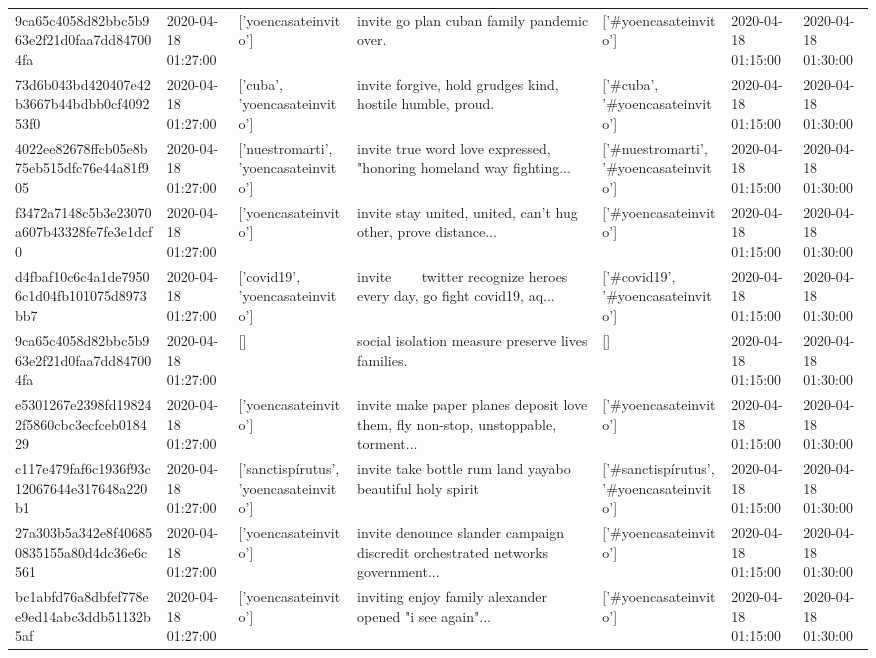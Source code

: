 \begin{tabular}{lllllll}
9ca65c4058d82bbc5b963e2f21d0faa7dd847004fa & 2020-04-18 01:27:00 & ['yoencasateinvito'] & invite go plan cuban family pandemic over. & ['#yoencasateinvito'] & 2020-04-18 01:15:00 & 2020-04-18 01:30:00 \\
73d6b043bd420407e42b3667b44bdbb0cf409253f0 & 2020-04-18 01:27:00 & ['cuba', 'yoencasateinvito'] & invite forgive, hold grudges kind, hostile humble, proud. & ['#cuba', '#yoencasateinvito'] & 2020-04-18 01:15:00 & 2020-04-18 01:30:00 \\
4022ee82678ffcb05e8b75eb515dfc76e44a81f905 & 2020-04-18 01:27:00 & ['nuestromarti', 'yoencasateinvito'] & invite true word love expressed, "honoring homeland way fighting... & ['#nuestromarti', '#yoencasateinvito'] & 2020-04-18 01:15:00 & 2020-04-18 01:30:00 \\
f3472a7148c5b3e23070a607b43328fe7fe3e1dcf0 & 2020-04-18 01:27:00 & ['yoencasateinvito'] & invite stay united, united, can't hug other, prove distance... & ['#yoencasateinvito'] & 2020-04-18 01:15:00 & 2020-04-18 01:30:00 \\
d4fbaf10c6c4a1de79506c1d04fb101075d8973bb7 & 2020-04-18 01:27:00 & ['covid19', 'yoencasateinvito'] & invite 👏 👏 👏 twitter recognize heroes every day, go fight covid19, aq... & ['#covid19', '#yoencasateinvito'] & 2020-04-18 01:15:00 & 2020-04-18 01:30:00 \\
9ca65c4058d82bbc5b963e2f21d0faa7dd847004fa & 2020-04-18 01:27:00 & [] & social isolation measure preserve lives families. & [] & 2020-04-18 01:15:00 & 2020-04-18 01:30:00 \\
e5301267e2398fd198242f5860cbc3ecfceb018429 & 2020-04-18 01:27:00 & ['yoencasateinvito'] & invite make paper planes deposit love them, fly non-stop, unstoppable, torment... & ['#yoencasateinvito'] & 2020-04-18 01:15:00 & 2020-04-18 01:30:00 \\
c117e479faf6c1936f93c12067644e317648a220b1 & 2020-04-18 01:27:00 & ['sanctispírutus', 'yoencasateinvito'] & invite take bottle rum land yayabo beautiful holy spirit & ['#sanctispírutus', '#yoencasateinvito'] & 2020-04-18 01:15:00 & 2020-04-18 01:30:00 \\
27a303b5a342e8f406850835155a80d4dc36e6c561 & 2020-04-18 01:27:00 & ['yoencasateinvito'] & invite denounce slander campaign discredit orchestrated networks government... & ['#yoencasateinvito'] & 2020-04-18 01:15:00 & 2020-04-18 01:30:00 \\
bc1abfd76a8dbfef778ee9ed14abc3ddb51132b5af & 2020-04-18 01:27:00 & ['yoencasateinvito'] & inviting enjoy family alexander opened "i see again"... & ['#yoencasateinvito'] & 2020-04-18 01:15:00 & 2020-04-18 01:30:00 \\

\end{tabular}
